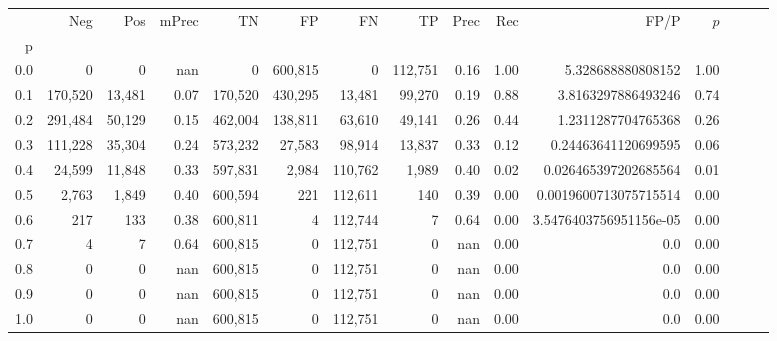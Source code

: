 \begin{tabular}{rrrrrrrrrrrrrrr}
\toprule
{} &      Neg &     Pos & mPrec &       TN &       FP &       FN &       TP &  Prec &   Rec &                    FP/P & $\hat{p}$ \\
p   &          &         &       &          &          &          &          &       &       &                         &           \\
\midrule
0.0 &        0 &       0 &   nan &        0 &  600,815 &        0 &  112,751 &  0.16 &  1.00 &       5.328688880808152 &      1.00 \\
0.1 &  170,520 &  13,481 &  0.07 &  170,520 &  430,295 &   13,481 &   99,270 &  0.19 &  0.88 &      3.8163297886493246 &      0.74 \\
0.2 &  291,484 &  50,129 &  0.15 &  462,004 &  138,811 &   63,610 &   49,141 &  0.26 &  0.44 &      1.2311287704765368 &      0.26 \\
0.3 &  111,228 &  35,304 &  0.24 &  573,232 &   27,583 &   98,914 &   13,837 &  0.33 &  0.12 &     0.24463641120699595 &      0.06 \\
0.4 &   24,599 &  11,848 &  0.33 &  597,831 &    2,984 &  110,762 &    1,989 &  0.40 &  0.02 &    0.026465397202685564 &      0.01 \\
0.5 &    2,763 &   1,849 &  0.40 &  600,594 &      221 &  112,611 &      140 &  0.39 &  0.00 &   0.0019600713075715514 &      0.00 \\
0.6 &      217 &     133 &  0.38 &  600,811 &        4 &  112,744 &        7 &  0.64 &  0.00 &  3.5476403756951156e-05 &      0.00 \\
0.7 &        4 &       7 &  0.64 &  600,815 &        0 &  112,751 &        0 &   nan &  0.00 &                     0.0 &      0.00 \\
0.8 &        0 &       0 &   nan &  600,815 &        0 &  112,751 &        0 &   nan &  0.00 &                     0.0 &      0.00 \\
0.9 &        0 &       0 &   nan &  600,815 &        0 &  112,751 &        0 &   nan &  0.00 &                     0.0 &      0.00 \\
1.0 &        0 &       0 &   nan &  600,815 &        0 &  112,751 &        0 &   nan &  0.00 &                     0.0 &      0.00 \\
\bottomrule
\end{tabular}
